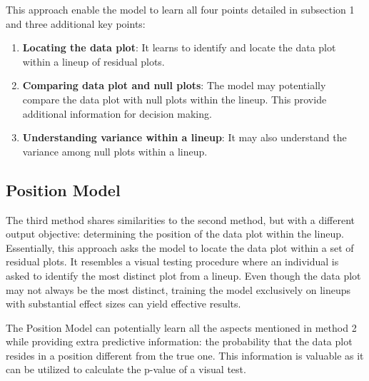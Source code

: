\documentclass[]{interact}
\theoremstyle{plain}%
\theoremstyle{definition}
\theoremstyle{remark}
\begin{document}
This approach enable the model to learn all four points detailed in
subsection 1 and three additional key points:

\begin{enumerate}
\def\labelenumi{\arabic{enumi}.}
\item
  \textbf{Locating the data plot}: It learns to identify and locate the
  data plot within a lineup of residual plots.
\item
  \textbf{Comparing data plot and null plots}: The model may potentially
  compare the data plot with null plots within the lineup. This provide
  additional information for decision making.
\item
  \textbf{Understanding variance within a lineup}: It may also
  understand the variance among null plots within a lineup.
\end{enumerate}

\hypertarget{position-model}{%
\subsection{Position Model}\label{position-model}}

The third method shares similarities to the second method, but with a
different output objective: determining the position of the data plot
within the lineup. Essentially, this approach asks the model to locate
the data plot within a set of residual plots. It resembles a visual
testing procedure where an individual is asked to identify the most
distinct plot from a lineup. Even though the data plot may not always be
the most distinct, training the model exclusively on lineups with
substantial effect sizes can yield effective results.

The Position Model can potentially learn all the aspects mentioned in
method 2 while providing extra predictive information: the probability
that the data plot resides in a position different from the true one.
This information is valuable as it can be utilized to calculate the
p-value of a visual test.
\end{document}
